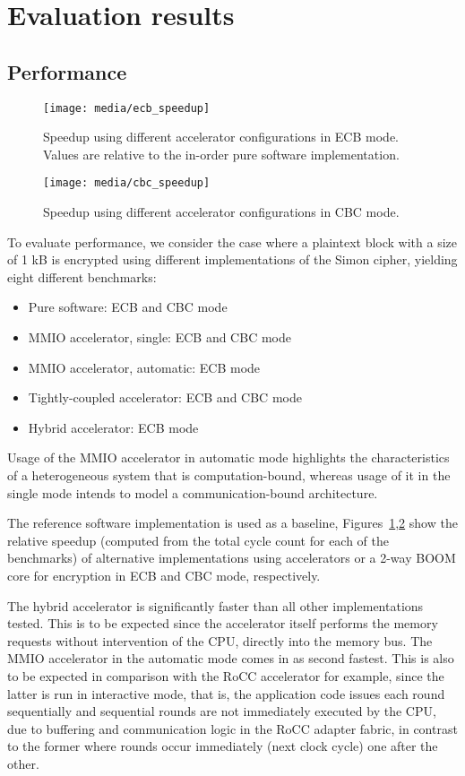 \documentclass[10pt,conference]{IEEEtran}
\begin{document}
\section{Evaluation results}

\subsection{Performance}

\begin{figure}
  \centering
  \texttt{[image: media/ecb\_speedup]}
  \caption{Speedup using different accelerator configurations in ECB mode.
    Values are relative to the in-order pure software implementation.}
  \label{fig:ecbspeedup}
\end{figure}

\begin{figure}
  \centering
  \texttt{[image: media/cbc\_speedup]}
  \caption{Speedup using different accelerator configurations in CBC mode.}
  \label{fig:cbcspeedup}
\end{figure}

To evaluate performance, we consider the case where a plaintext block with a size of
1 kB is encrypted using different implementations of the Simon cipher, yielding
eight different benchmarks:

\begin{itemize}
\item Pure software: ECB and CBC mode
\item MMIO accelerator, single: ECB and CBC mode
\item MMIO accelerator, automatic: ECB mode
\item Tightly-coupled accelerator: ECB and CBC mode
\item Hybrid accelerator: ECB mode
\end{itemize}

Usage of the MMIO accelerator in automatic mode highlights the characteristics
of a heterogeneous system that is computation-bound, whereas usage of it in the
single mode intends to model a communication-bound architecture.

The reference software implementation is used as a baseline,
Figures~\ref{fig:ecbspeedup},\ref{fig:cbcspeedup} show the relative speedup
(computed from the total cycle count for each of the benchmarks) of alternative
implementations using accelerators or a 2-way BOOM core for encryption in ECB
and CBC mode, respectively.

The hybrid accelerator is significantly faster than all other implementations
tested. This is to be expected since the accelerator itself performs the memory
requests without intervention of the CPU, directly into the memory bus. The
MMIO accelerator in the automatic mode comes in as second fastest. This
is also to be expected in comparison with the RoCC accelerator for example,
since the latter is run in interactive mode, that is, the application code
issues each round sequentially and sequential rounds are not immediately
executed by the CPU, due to buffering and communication logic in the RoCC
adapter fabric, in contrast to the former where rounds occur immediately (next
clock cycle) one after the other.
\end{document}
